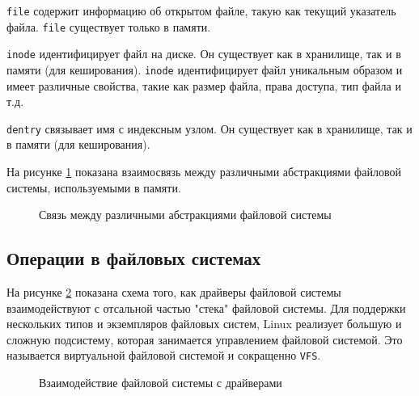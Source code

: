 \documentclass{article}
\begin{document}
    \texttt{file} содержит информацию об открытом файле, такую как текущий
    указатель файла. \texttt{file} существует только в памяти.

    \texttt{inode} идентифицирует файл на диске. Он существует как в хранилище,
    так и в памяти (для кеширования). \texttt{inode} идентифицирует файл
    уникальным образом и имеет различные свойства, такие как размер файла,
    права доступа, тип файла и т.д.

    \texttt{dentry} связывает имя с индексным узлом. Он существует как в
    хранилище, так и в памяти (для кеширования).

    На рисунке \ref{fs} показана взаимосвязь между различными абстракциями файловой системы,
    используемыми в памяти.

    \begin{figure}[h!]
        \caption{Связь между различными абстракциями файловой системы}
        \label{fs}
    \end{figure}

    \subsection{Операции в файловых системах}
    На рисунке \ref{fs_dr} показана схема того, как драйверы файловой системы
    взаимодействуют с отсальной частью "стека" файловой системы. Для поддержки
    нескольких типов и экземпляров файловых систем, Linux реализует большую
    и сложную подсистему, которая занимается управлением файловой системой.
    Это называется виртуальной файловой системой и сокращенно \texttt{VFS}.

    \begin{figure}[h!]
        \caption{Взаимодействие файловой системы с драйверами}
        \label{fs_dr}
    \end{figure}
\end{document}
